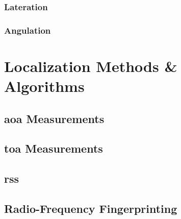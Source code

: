 \subsubsection{Lateration}

\subsubsection{Angulation}

\section{Localization Methods \& Algorithms}

\subsection{\acf{aoa} Measurements}

\subsection{\acf{toa} Measurements}

\subsection{\acf{rss}}

\subsection{Radio-Frequency Fingerprinting}
